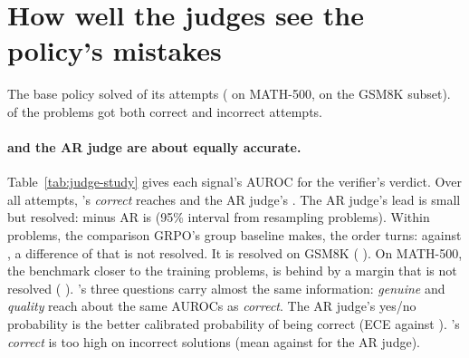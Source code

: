 
\section{How well the judges see the policy's mistakes}\label{sec:res-study}

The base policy solved  of its  attempts ( on MATH-500,
 on the GSM8K subset).  of the  problems got both correct and incorrect
attempts.

\paragraph{\kev{} and the AR judge are about equally accurate.} Table~\ref{tab:judge-study} gives each signal's AUROC
for the verifier's verdict. Over all attempts, \kev{}'s \emph{correct} reaches  and the AR judge's
. The AR judge's lead is small but resolved: \kev{} minus AR is 
 (95\% interval from resampling problems). Within problems, the
comparison GRPO's group baseline makes, the order turns:  against , a
difference of   that is not resolved. It
is resolved on GSM8K ( ). On MATH-500, the
benchmark closer to the training problems, \kev{} is behind by a margin that is not resolved (
). \kev{}'s three questions carry almost the same information:
\emph{genuine} and \emph{quality} reach about the same AUROCs as \emph{correct}. The AR
judge's yes/no probability is the better calibrated probability of being correct (ECE  against
). \kev{}'s \emph{correct} is too high on incorrect solutions (mean  against
 for the AR judge).

\begin{table}[t]
\centering\small

\caption{AUROC of each judge signal for the verifier's verdict on 4 base-policy attempts at each of 1000 problems
(MATH-500 and 500 GSM8K test problems), over all attempts and within problems (pairs of attempts at the same problem with
different verdicts); ECE and Brier score of the signal as a probability of being correct (meaningful mainly for the
\emph{correct} questions).}
\label{tab:judge-study}
\end{table}

